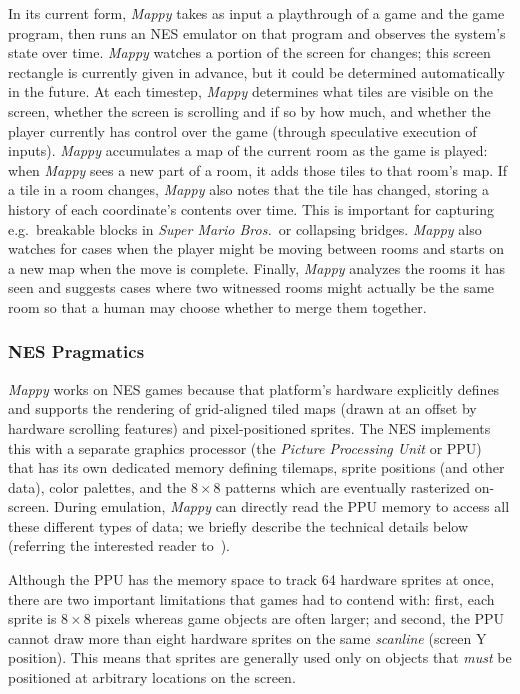 \documentclass[12pt]{report}
\begin{document}
In its current form, \emph{Mappy} takes as input a playthrough of a game and the game program, then runs an NES emulator on that program and observes the system's state over time.
\emph{Mappy} watches a portion of the screen for changes; this screen rectangle is currently given in advance, but it could be determined automatically in the future.
At each timestep, \emph{Mappy} determines what tiles are visible on the screen, whether the screen is scrolling and if so by how much, and whether the player currently has control over the game (through speculative execution of inputs).
\emph{Mappy} accumulates a map of the current room as the game is played: when \emph{Mappy} sees a new part of a room, it adds those tiles to that room's map.
If a tile in a room changes, \emph{Mappy} also notes that the tile has changed, storing a history of each coordinate's contents over time.
This is important for capturing e.g.\ breakable blocks in \emph{Super Mario Bros.}\ or collapsing bridges.
\emph{Mappy} also watches for cases when the player might be moving between rooms and starts on a new map when the move is complete.
Finally, \emph{Mappy} analyzes the rooms it has seen and suggests cases where two witnessed rooms might actually be the same room so that a human may choose whether to merge them together.

\subsubsection*{NES Pragmatics}

\emph{Mappy} works on NES games because that platform's hardware explicitly defines and supports the rendering of grid-aligned tiled maps (drawn at an offset by hardware scrolling features) and pixel-positioned sprites.
The NES implements this with a separate graphics processor (the \emph{Picture Processing Unit} or PPU) that has its own dedicated memory defining tilemaps, sprite positions (and other data), color palettes, and the \(8 \times 8\) patterns which are eventually rasterized on-screen.
During emulation, \emph{Mappy} can directly read the PPU memory to access all these different types of data; we briefly describe the technical details below (referring the interested reader to~\cite{nesdev}).

Although the PPU has the memory space to track 64 hardware sprites at once, there are two important limitations that games had to contend with: first, each sprite is \(8 \times 8\) pixels whereas game objects are often larger; and second, the PPU cannot draw more than eight hardware sprites on the same \emph{scanline} (screen Y position).
This means that sprites are generally used only on objects that \emph{must} be positioned at arbitrary locations on the screen.
\end{document}
